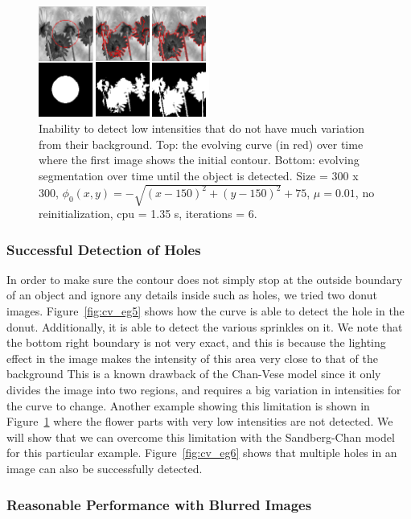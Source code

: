 \documentclass[10pt,twocolumn,letterpaper]{article}
\begin{document}
\begin{figure}[t]
\centering
\includegraphics[width=0.5\textwidth]{cv_eg7.png}
\caption{Inability to detect low intensities that do not have much variation from their background.  Top: the evolving curve (in red) over time where the
first
image shows the initial
contour. Bottom: evolving segmentation over time until the object is detected. Size = 300 x 300, $\phi_{0}(x,y) = - \sqrt{(x - 150)^2 + (y - 150)^2} + 75$,
$\mu =0.01$, no reinitialization, cpu = 1.35 s, iterations = 6.}
\label{fig:cv_eg7}
\end{figure}



\subsubsection*{Successful Detection of Holes}

In order to make sure the contour does not simply stop at the outside boundary of an object and ignore any details inside such as holes, we tried two donut
images. Figure~\ref{fig:cv_eg5} shows how the curve is able to detect the hole in the donut. Additionally, it is able to detect the various sprinkles on it.
We note that the bottom right boundary is not very exact, and this is because the lighting effect in the image makes the intensity of this area very close to
that of the background This is a known drawback of the Chan-Vese model since it only divides the image into two regions, and requires a big variation in
intensities for the curve to change. Another example showing this limitation is shown in Figure~\ref{fig:cv_eg7} where the flower parts with very low
intensities are not detected. We will show that we can overcome this limitation with the Sandberg-Chan model for this particular example.
Figure~\ref{fig:cv_eg6} shows that multiple holes in an image can also be successfully detected.


\subsubsection*{Reasonable Performance with Blurred Images}
\end{document}
